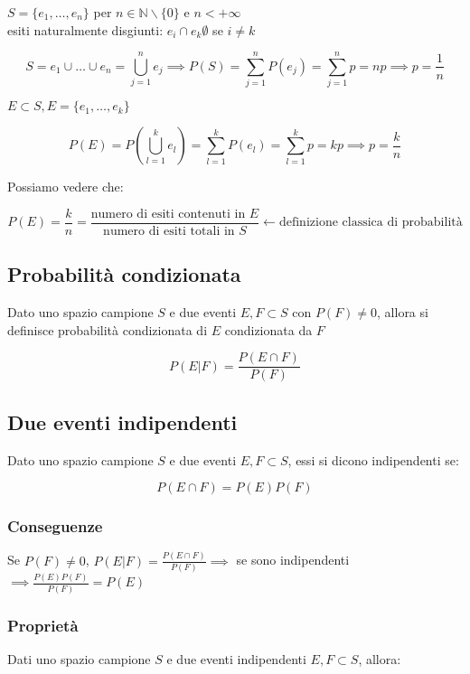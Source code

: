\documentclass{article}
\begin{document}
$S = \{e_1, \dots, e_n\}$ per $n \in \mathbb{N} \backslash \{0\}$ e $n < +\infty$\\

\noindent
esiti naturalmente disgiunti: $e_i \cap e_k \emptyset$ se $i \neq k$

$$
S = e_1 \cup \dots \cup e_n = \bigcup^n_{j=1} e_j \implies P(S) = \sum^n_{j=1} P(e_j) = \sum^n_{j=1} p = np \implies p = \frac{1}{n}
$$

\noindent
$E \subset S, E = \{e_1, \dots, e_k\}$

$$
P(E) = P(\bigcup^k_{l=1} e_l) = \sum^k_{l=1} P(e_l) = \sum^k_{l=1} p = kp \implies p = \frac{k}{n}
$$

\noindent
Possiamo vedere che:

$$
P(E) = \frac{k}{n} = \frac{\text{numero di esiti contenuti in } E}{\text{numero di esiti totali in } S} \leftarrow \text{definizione classica di probabilità}
$$

\subsection{Probabilità condizionata}

Dato uno spazio campione $S$ e due eventi $E, F \subset S$ con $P(F) \neq 0$, allora si definisce probabilità condizionata di $E$ condizionata da $F$

$$
P(E | F) = \frac{P(E \cap F)}{P(F)}
$$

\subsection{Due eventi indipendenti}

Dato uno spazio campione $S$ e due eventi $E, F \subset S$, essi si dicono indipendenti se:

$$
P(E \cap F) = P(E)P(F)
$$

\subsubsection{Conseguenze}

Se $P(F) \neq 0$, $P(E|F) = \frac{P(E \cap F)}{P(F)} \implies$ se sono indipendenti $\implies \frac{P(E)P(F)}{P(F)} = P(E)$

\subsubsection{Proprietà}

Dati uno spazio campione $S$ e due eventi indipendenti $E,F \subset S$, allora:
\end{document}
